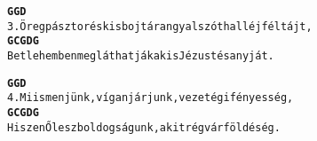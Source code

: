 \begin{minipage}{\textwidth}
\kottastart
{}
\kottaend
\begin{minipage}{\textwidth}
\begin{alltt}
\textbf{         G                           G             D}
3. Öreg pásztor és kisbojtár angyalszót hall éjféltájt,
\textbf{         G               C         G     D      G}
   Betlehemben megláthatják a kis Jézust és anyját.
\end{alltt}
\vspace{0.0cm}
\versszakspacing
\end{minipage}
\begin{minipage}{\textwidth}
\begin{alltt}
\textbf{          G                            G          D}
4. Mi is menjünk, vígan járjunk, vezet égi fényesség,
\textbf{          G               C          G       D      G}
   Hiszen Ő lesz boldogságunk, akit rég vár föld és ég.
\end{alltt}
\vspace{0.0cm}
\versszakspacing
\end{minipage}
\end{minipage}
~\vspace{1.0cm}
\newline
